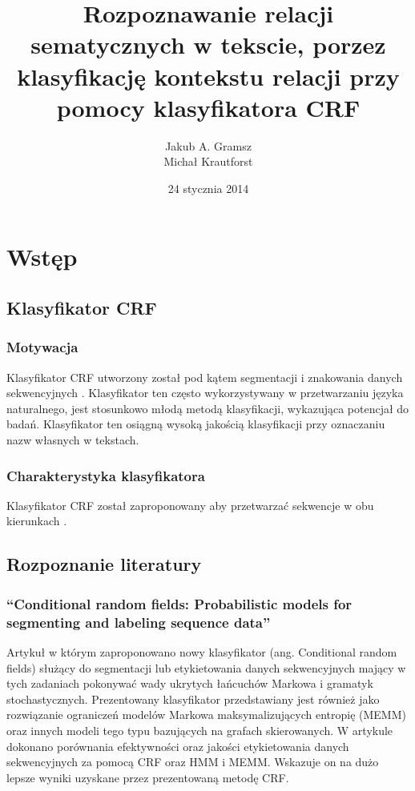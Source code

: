 \documentclass[a4paper,10pt]{report}
\title{Rozpoznawanie relacji sematycznych w tekscie, porzez klasyfikację kontekstu relacji przy pomocy klasyfikatora \textbf{CRF}}
\author{Jakub A. Gramsz \\ Michał Krautforst}
\date{24 stycznia 2014}
\begin{document}
\renewcommand{\figurename}{Wykres}
\renewcommand{\chaptername}{}

\maketitle
\tableofcontents

\chapter{Wstęp} %

\section{Klasyfikator CRF} 

\subsection{Motywacja}

Klasyfikator CRF utworzony został pod kątem segmentacji i znakowania danych sekwencyjnych \cite{lafferty2001crf}. Klasyfikator ten często wykorzystywany w przetwarzaniu języka naturalnego, jest stosunkowo młodą metodą klasyfikacji, wykazująca potencjał do badań. Klasyfikator ten osiągną wysoką jakością klasyfikacji przy oznaczaniu nazw własnych w tekstach.

\subsection{Charakterystyka klasyfikatora}

Klasyfikator CRF został zaproponowany aby przetwarzać sekwencje w obu kierunkach \cite{lafferty2001crf}.

\section{Rozpoznanie literatury}

\subsection{``Conditional random fields: Probabilistic models for segmenting and labeling sequence data'' \cite{lafferty2001crf}}

Artykuł w którym zaproponowano nowy klasyfikator (ang. Conditional random fields) służący do segmentacji lub etykietowania danych sekwencyjnych mający w tych zadaniach pokonywać wady ukrytych łańcuchów Markowa i gramatyk stochastycznych. Prezentowany klasyfikator przedstawiany jest również jako rozwiązanie ograniczeń modelów Markowa maksymalizujących entropię (MEMM) oraz innych modeli tego typu bazujących na grafach skierowanych. W artykule dokonano porównania efektywności oraz jakości etykietowania danych sekwencyjnych za pomocą CRF oraz HMM i MEMM. Wskazuje on na dużo lepsze wyniki uzyskane przez prezentowaną metodę CRF. 
\end{document}
